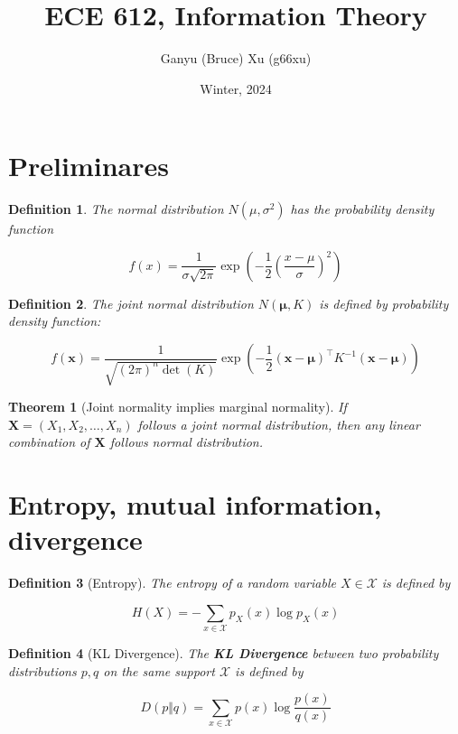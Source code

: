 \documentclass{article}
\title{ECE 612, Information Theory}
\author{Ganyu (Bruce) Xu (g66xu)}
\date{Winter, 2024}
\newtheorem{definition}{Definition}[section]
\newtheorem{theorem}{Theorem}[section]
\begin{document}
\maketitle

\section*{Preliminares}
    \begin{definition}
        The normal distribution $N(\mu, \sigma^2)$ has the probability density function

        $$
        f(x) = \frac{1}{\sigma\sqrt{2\pi}}\exp(-\frac{1}{2}(\frac{x-\mu}{\sigma})^2)
        $$
    \end{definition}

    \begin{definition}
        The joint normal distribution $N(\mathbf{\mu}, K)$ is defined by probability density function:

        $$
        f(\mathbf{x}) = \frac{1}{\sqrt{(2\pi)^n\det(K)}}
        \exp(-\frac{1}{2}
            (\mathbf{x} - \mathbf{\mu})^\intercal
            K^{-1}
            (\mathbf{x} - \mathbf{\mu})
        )
        $$
    \end{definition}

    \begin{theorem}[Joint normality implies marginal normality]
        If $\mathbf{X} = (X_1, X_2, \ldots, X_n)$ follows a joint normal distribution, then any linear combination of $\mathbf{X}$ follows normal distribution.
    \end{theorem}

\section{Entropy, mutual information, divergence}
    \begin{definition}[Entropy]
    The entropy of a random variable $X \in \mathcal{X}$ is defined by

        \begin{equation*}
            H(X) = -\sum_{x \in \mathcal{X}}p_X(x)\log{p_X(x)}
        \end{equation*}
    \end{definition}

    \begin{definition}[KL Divergence]
        The \textbf{KL Divergence} between two probability distributions $p, q$ on the same support $\mathcal{X}$ is defined by

        \begin{equation*}
            D(p \Vert q) = \sum_{x \in \mathcal{X}} p(x) \log{
                \frac{p(x)}{q(x)}
            }
        \end{equation*}
    \end{definition}
\end{document}
